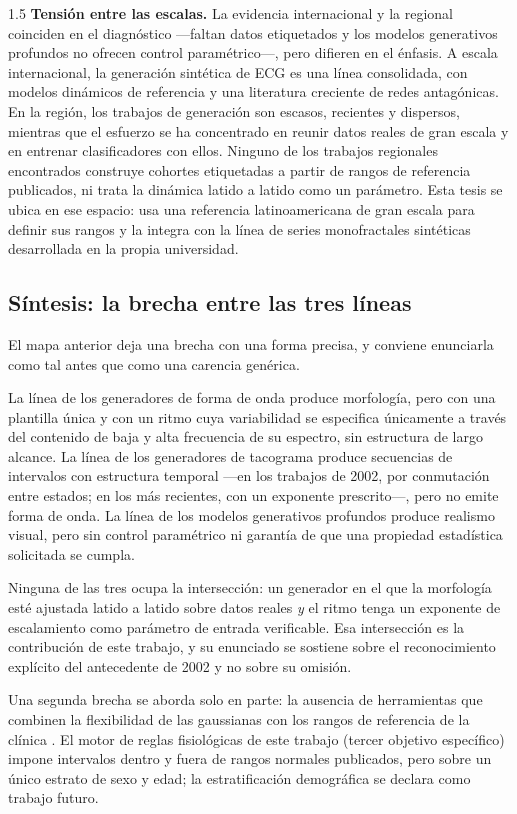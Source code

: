 \begin{spacing}{1.5}
\textbf{Tensión entre las escalas.} La evidencia internacional y la regional coinciden en el diagnóstico ---faltan datos etiquetados y los modelos generativos profundos no ofrecen control paramétrico---, pero difieren en el énfasis. A escala internacional, la generación sintética de ECG es una línea consolidada, con modelos dinámicos de referencia y una literatura creciente de redes antagónicas. En la región, los trabajos de generación son escasos, recientes y dispersos, mientras que el esfuerzo se ha concentrado en reunir datos reales de gran escala y en entrenar clasificadores con ellos. Ninguno de los trabajos regionales encontrados construye cohortes etiquetadas a partir de rangos de referencia publicados, ni trata la dinámica latido a latido como un parámetro. Esta tesis se ubica en ese espacio: usa una referencia latinoamericana de gran escala para definir sus rangos y la integra con la línea de series monofractales sintéticas desarrollada en la propia universidad.

\subsection{Síntesis: la brecha entre las tres líneas}

El mapa anterior deja una brecha con una forma precisa, y conviene enunciarla como tal antes que como una carencia genérica.

La línea de los generadores de forma de onda produce morfología, pero con una plantilla única y con un ritmo cuya variabilidad se especifica únicamente a través del contenido de baja y alta frecuencia de su espectro, sin estructura de largo alcance. La línea de los generadores de tacograma produce secuencias de intervalos con estructura temporal ---en los trabajos de 2002, por conmutación entre estados; en los más recientes, con un exponente prescrito---, pero no emite forma de onda. La línea de los modelos generativos profundos produce realismo visual, pero sin control paramétrico ni garantía de que una propiedad estadística solicitada se cumpla.

Ninguna de las tres ocupa la intersección: un generador en el que la morfología esté ajustada latido a latido sobre datos reales \emph{y} el ritmo tenga un exponente de escalamiento como parámetro de entrada verificable. Esa intersección es la contribución de este trabajo, y su enunciado se sostiene sobre el reconocimiento explícito del antecedente de 2002 y no sobre su omisión.

Una segunda brecha se aborda solo en parte: la ausencia de herramientas que combinen la flexibilidad de las gaussianas con los rangos de referencia de la clínica \cite{palhares2017normal,rautaharju2009aha}. El motor de reglas fisiológicas de este trabajo (tercer objetivo específico) impone intervalos dentro y fuera de rangos normales publicados, pero sobre un único estrato de sexo y edad; la estratificación demográfica se declara como trabajo futuro.

\end{spacing} 
